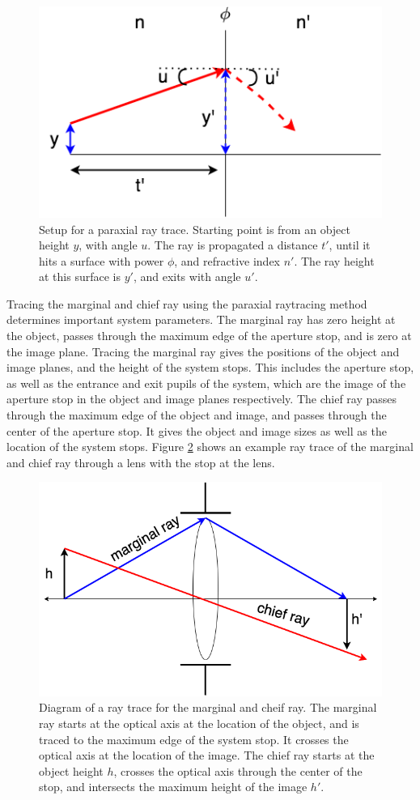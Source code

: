 \begin{figure}
    \centering
    \includegraphics[width=.5\textwidth]{Chapter Materials/Chapter Three Materials/paraxialray.png}
    \caption{Setup for a paraxial ray trace. Starting point is from an object height $y$, with angle $u$. The ray is propagated a distance $t'$, until it hits a surface with power $\phi$, and refractive index $n'$. The ray height at this surface is $y'$, and exits with angle $u'$.}
    \label{fig:paraxial}
\end{figure}




Tracing the marginal and chief ray using the paraxial raytracing method determines important system parameters. The marginal ray has zero height at the object, passes through the maximum edge of the aperture stop, and is zero at the image plane. Tracing the marginal ray gives the positions of the object and image planes, and the height of the system stops. This includes the aperture stop, as well as the entrance and exit pupils of the system, which are the image of the aperture stop in the object and image planes respectively. The chief ray passes through the maximum edge of the object and image, and passes through the center of the aperture stop. It gives the object and image sizes as well as the location of the system stops. Figure \ref{fig:chiefray} shows an example ray trace of the marginal and chief ray through a lens with the stop at the lens. 


\begin{figure}
    \centering
    \includegraphics[width=.6\textwidth]{Chapter Materials/Chapter Three Materials/chiefandmarginal.png}
    \caption{Diagram of a ray trace for the marginal and cheif ray. The marginal ray starts at the optical axis at the location of the object, and is traced to the maximum edge of the system stop. It crosses the optical axis at the location of the image. The chief ray starts at the object height $h$, crosses the optical axis through the center of the stop, and intersects the maximum height of the image $h'$. }
    \label{fig:chiefray}
\end{figure}



